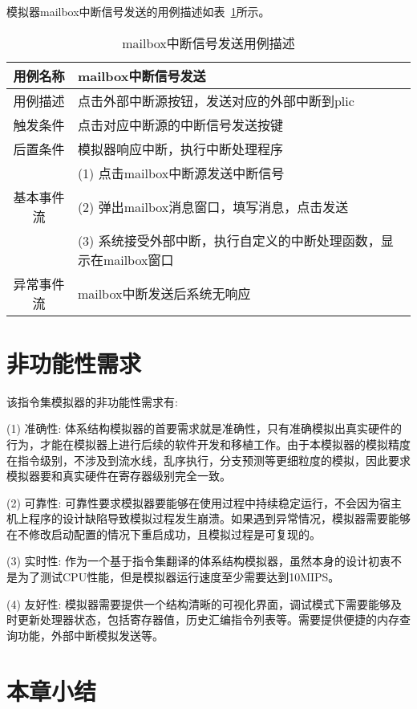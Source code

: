 模拟器mailbox中断信号发送的用例描述如表~\ref{tab:yongli5}所示。
\begin{table}[h]
  \centering
  \caption{mailbox中断信号发送用例描述}
  \label{tab:yongli5}
  \begin{tabular}{cl}
    \toprule
用例名称 & mailbox中断信号发送\\
    \midrule
用例描述	& 点击外部中断源按钮，发送对应的外部中断到plic\\ \hline
触发条件	& 点击对应中断源的中断信号发送按键\\ \hline
后置条件	& 模拟器响应中断，执行中断处理程序\\ \hline
 &	(1)	点击mailbox中断源发送中断信号\\
 基本事件流 & (2)	弹出mailbox消息窗口，填写消息，点击发送\\
 & (3)	系统接受外部中断，执行自定义的中断处理函数，显示在mailbox窗口\\ \hline
异常事件流 &	mailbox中断发送后系统无响应\\
    \bottomrule
  \end{tabular}
\end{table}


\section{非功能性需求}

该指令集模拟器的非功能性需求有:


(1) 准确性: 体系结构模拟器的首要需求就是准确性，只有准确模拟出真实硬件的行为，才能在模拟器上进行后续的软件开发和移植工作。由于本模拟器的模拟精度在指令级别，不涉及到流水线，乱序执行，分支预测等更细粒度的模拟，因此要求模拟器要和真实硬件在寄存器级别完全一致。


(2) 可靠性: 可靠性要求模拟器要能够在使用过程中持续稳定运行，不会因为宿主机上程序的设计缺陷导致模拟过程发生崩溃。如果遇到异常情况，模拟器需要能够在不修改启动配置的情况下重启成功，且模拟过程是可复现的。


(3) 实时性: 作为一个基于指令集翻译的体系结构模拟器，虽然本身的设计初衷不是为了测试CPU性能，但是模拟器运行速度至少需要达到10MIPS。


(4) 友好性: 模拟器需要提供一个结构清晰的可视化界面，调试模式下需要能够及时更新处理器状态，包括寄存器值，历史汇编指令列表等。需要提供便捷的内存查询功能，外部中断模拟发送等。




\section{本章小结}


